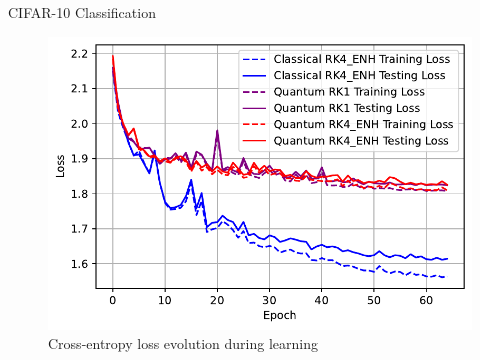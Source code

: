 \documentclass[]{beamer}
\begin{document}
\begin{frame}{CIFAR-10 Classification}
\end{frame}

\begin{frame}
  \begin{figure}[th]
    \centering
    \includegraphics[scale=0.7]{./pics/new_pdf_graphs/hybrid/hybrid_transfomer_loss_cifar10_rk4_enh.pdf}
    \caption[Cross-entropy loss evolution during learning]{Cross-entropy loss evolution during learning}
    \label{fig:p26}
  \end{figure}
\end{frame}
\end{document}
